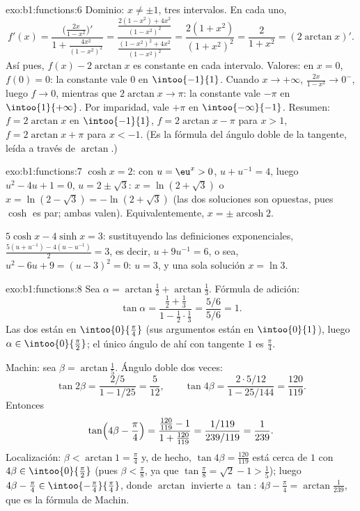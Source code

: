 \begin{solution}{exo:b1:functions:6}
Dominio: $x \neq \pm 1$, tres intervalos. En cada uno,
\[
f'(x) = \frac{\bigl(\frac{2x}{1-x^2}\bigr)'}{1 +
\frac{4x^2}{(1-x^2)^2}}
= \frac{\frac{2(1-x^2) + 4x^2}{(1-x^2)^2}}
{\frac{(1-x^2)^2 + 4x^2}{(1-x^2)^2}}
= \frac{2(1 + x^2)}{(1 + x^2)^2} = \frac{2}{1 + x^2}
= (2\arctan x)' .
\]
Así pues, $f(x) - 2\arctan x$ es constante en cada intervalo. Valores:
en $x = 0$, $f(0) = 0$: la constante vale $0$ en $\intoo{-1}{1}$.
Cuando $x \to +\infty$, $\frac{2x}{1-x^2} \to 0^-$, luego $f \to 0$,
mientras que $2\arctan x \to \pi$: la constante vale $-\pi$ en
$\intoo{1}{+\infty}$. Por imparidad, vale $+\pi$ en
$\intoo{-\infty}{-1}$. Resumen: $f = 2\arctan x$ en $\intoo{-1}{1}$,
$f = 2\arctan x - \pi$ para $x > 1$, $f = 2\arctan x + \pi$ para
$x < -1$. (Es la fórmula del ángulo doble de la tangente, leída a
través de $\arctan$.)
\end{solution}

\begin{solution}{exo:b1:functions:7}
$\cosh x = 2$: con $u = \eu^x > 0$, $u + u^{-1} = 4$, luego
$u^2 - 4u + 1 = 0$, $u = 2 \pm \sqrt 3$: $x = \ln(2 + \sqrt 3)$ o
$x = \ln(2 - \sqrt 3) = -\ln(2 + \sqrt 3)$ (las dos soluciones son
opuestas, pues $\cosh$ es par; ambas valen). Equivalentemente,
$x = \pm \operatorname{arcosh} 2$.

$5\cosh x - 4\sinh x = 3$: sustituyendo las definiciones
exponenciales, $\frac{5(u + u^{-1}) - 4(u - u^{-1})}{2} = 3$, es decir,
$u + 9u^{-1} = 6$, o sea, $u^2 - 6u + 9 = (u - 3)^2 = 0$: $u = 3$, y
una sola solución $x = \ln 3$.
\end{solution}

\begin{solution}{exo:b1:functions:8}
Sea $\alpha = \arctan\frac12 + \arctan\frac13$. Fórmula de adición:
\[
\tan\alpha = \frac{\frac12 + \frac13}{1 - \frac12\cdot\frac13}
= \frac{5/6}{5/6} = 1 .
\]
Las dos  están en $\intoo{0}{\frac\pi4}$ (sus argumentos
están en $\intoo{0}{1}$), luego $\alpha \in \intoo{0}{\frac\pi2}$; el
único ángulo de ahí con tangente $1$ es $\frac\pi4$.

Machin: sea $\beta = \arctan\frac15$. Ángulo doble dos veces:
\[
\tan 2\beta = \frac{2/5}{1 - 1/25} = \frac{5}{12},
\qquad
\tan 4\beta = \frac{2 \cdot 5/12}{1 - 25/144} = \frac{120}{119}.
\]
Entonces
\[
\tan\Bigl(4\beta - \frac\pi4\Bigr)
= \frac{\frac{120}{119} - 1}{1 + \frac{120}{119}}
= \frac{1/119}{239/119} = \frac{1}{239}.
\]
Localización: $\beta < \arctan 1 = \frac\pi4$ y, de hecho,
$\tan 4\beta = \frac{120}{119}$ está cerca de $1$ con
$4\beta \in \intoo{0}{\frac\pi2}$ (pues $\beta < \frac\pi8$, ya que
$\tan\frac\pi8 = \sqrt 2 - 1 > \frac15$); luego
$4\beta - \frac\pi4 \in \intoo{-\frac\pi4}{\frac\pi4}$, donde
$\arctan$ invierte a $\tan$: $4\beta - \frac\pi4 =
\arctan\frac{1}{239}$, que es la fórmula de Machin.
\end{solution}

